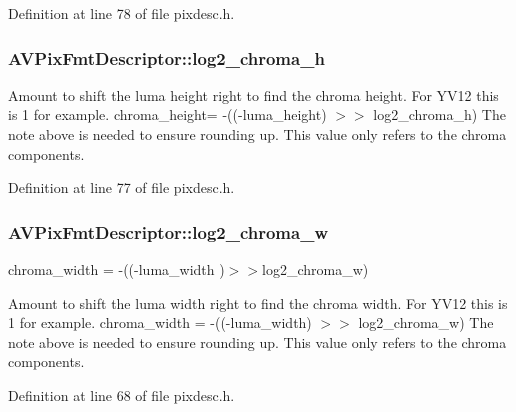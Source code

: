 Definition at line 78 of file pixdesc.\+h.

\subsubsection[{\texorpdfstring{log2\+\_\+chroma\+\_\+h}{log2_chroma_h}}]{ A\+V\+Pix\+Fmt\+Descriptor\+::log2\+\_\+chroma\+\_\+h}\hypertarget{struct_a_v_pix_fmt_descriptor_abea8ed308fe00644fc066a00018afa95}{}\label{struct_a_v_pix_fmt_descriptor_abea8ed308fe00644fc066a00018afa95}
Amount to shift the luma height right to find the chroma height. For Y\+V12 this is 1 for example. chroma\+\_\+height= -\/((-\/luma\+\_\+height) $>$$>$ log2\+\_\+chroma\+\_\+h) The note above is needed to ensure rounding up. This value only refers to the chroma components. 

Definition at line 77 of file pixdesc.\+h.

\subsubsection[{\texorpdfstring{log2\+\_\+chroma\+\_\+w}{log2_chroma_w}}]{ A\+V\+Pix\+Fmt\+Descriptor\+::log2\+\_\+chroma\+\_\+w}\hypertarget{struct_a_v_pix_fmt_descriptor_a4abca4534188ff94627e88c0d8362058}{}\label{struct_a_v_pix_fmt_descriptor_a4abca4534188ff94627e88c0d8362058}


chroma\+\_\+width = -\/((-\/luma\+\_\+width )$>$$>$log2\+\_\+chroma\+\_\+w) 

Amount to shift the luma width right to find the chroma width. For Y\+V12 this is 1 for example. chroma\+\_\+width = -\/((-\/luma\+\_\+width) $>$$>$ log2\+\_\+chroma\+\_\+w) The note above is needed to ensure rounding up. This value only refers to the chroma components. 

Definition at line 68 of file pixdesc.\+h.

